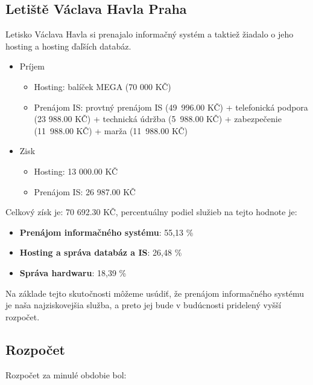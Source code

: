 \documentclass[a4paper, 11pt]{article}
\begin{document}
\subsection*{Letiště Václava Havla Praha}
Letisko Václava Havla si prenajalo informačný systém a taktiež žiadalo o jeho hosting a hosting ďaľších databáz.
\begin{itemize}
\item Príjem
\begin{itemize}
\item Hosting: balíček MEGA (70 000 KČ)
\item Prenájom IS: provtný prenájom IS (49~996.00 KČ) + telefonická podpora (23 988.00 KČ) + technická údržba (5~988.00 KČ) + zabezpečenie (11~988.00 KČ) + marža (11~988.00 KČ)
\end{itemize}

\item Zisk
\begin{itemize}
\item Hosting: 13 000.00 KČ
\item Prenájom IS: 26 987.00 KČ
\end{itemize}
\end{itemize}

Celkový získ je: 70 692.30 KČ, percentuálny podiel služieb na tejto hodnote je:
\begin{itemize}
\item \textbf{Prenájom informačného systému}: 55,13 \%
\item \textbf{Hosting a správa databáz a IS}: 26,48 \%
\item \textbf{Správa hardwaru}: 18,39 \%
\end{itemize}

Na základe tejto skutočnosti môžeme usúdiť, že prenájom informačného systému je naša najziskovejšia služba, a preto jej bude v budúcnosti pridelený vyšší rozpočet.
\clearpage

\subsection*{Rozpočet}
 Rozpočet za minulé obdobie bol:
\end{document}
